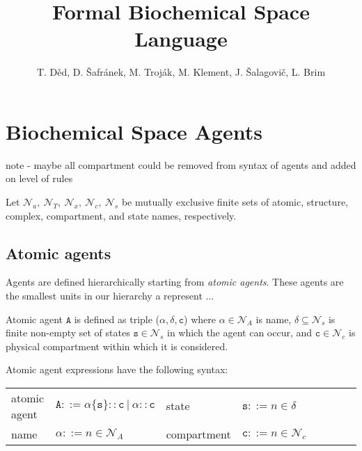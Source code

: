 \documentclass{entcs}
\renewcommand{\~}[0]{\texttildelow}
\newcommand{\choice}{|}
\begin{document}
\begin{frontmatter}
\title{Formal Biochemical Space Language}

\author{\normalsize
T. D\v{e}d, D. \v{S}afr\'anek, M. Troj\'ak, M. Klement, J. \v{S}alagovi\v{c}, L. Brim}
\address{Faculty of Informatics, Masaryk University\\
Brno, Czech Republic
}

\end{frontmatter}

\section{Biochemical Space Agents}

note - maybe all compartment could be removed from syntax of agents and added on level of rules

Let $\mathcal{N}_{a},~\mathcal{N}_{T},~\mathcal{N}_{x},~\mathcal{N}_{c},~\mathcal{N}_{s}$ be mutually exclusive finite sets of atomic, structure, complex, compartment, and state names, respectively. 

\subsection{Atomic agents}

Agents are defined hierarchically starting from \emph{atomic agents}. These agents are the smallest units in our hierarchy a represent ...

\begin{definition}
Atomic agent $\mathtt{A}$ is defined as triple ($\alpha, \delta, \mathtt{c}$) where $\alpha \in \mathcal{N}_{A}$ is name, $\delta \subseteq \mathcal{N}_{s}$ is finite non-empty set of states $\mathtt{s} \in \mathcal{N}_{s}$ in which the agent can occur, and $\mathtt{c} \in \mathcal{N}_{c}$ is physical compartment within which it is considered.
\end{definition}

Atomic agent expressions have the following syntax:

\begin{center}
{\small
\hspace*{-1cm}\begin{tabular}{ ll ll ll ll }
 atomic agent & $\mathtt{A} ::= \alpha\{\mathtt{s}\}::\mathtt{c}~\choice~\alpha::\mathtt{c}$ & state & $\mathtt{s} ::= n \in \delta$\\
 name & $\alpha ::= n \in \mathcal{N}_{A}$ & compartment & $\mathtt{c} ::= n \in \mathcal{N}_{c}$\\
\end{tabular}
}
\end{center}
\end{document}
